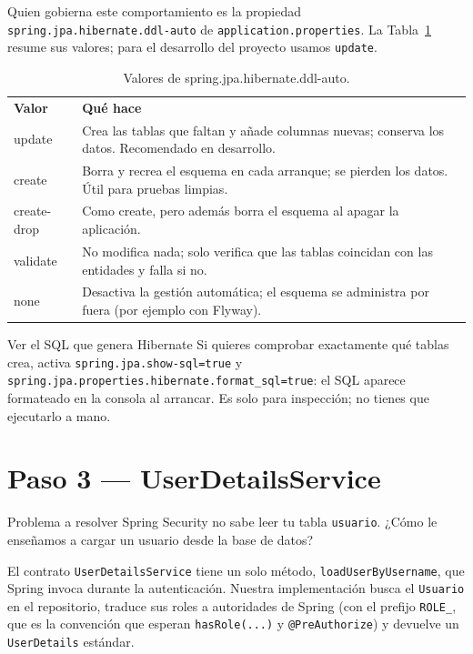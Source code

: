 \documentclass[11pt]{article}
\begin{document}
Quien gobierna este comportamiento es la propiedad \texttt{spring.\allowbreak{}jpa.\allowbreak{}hibernate.\allowbreak{}ddl-auto} de \texttt{application.properties}. La Tabla~\ref{tab:ddlauto} resume sus valores; para el desarrollo del proyecto usamos \texttt{update}.

\begin{table}[h]
\centering
\caption{Valores de spring.jpa.hibernate.ddl-auto.}
\label{tab:ddlauto}
\renewcommand{\arraystretch}{1.25}
\begin{tabular}{>{\ttfamily}p{2.6cm} >{\raggedright\arraybackslash}p{11.4cm}}
\rowcolor{jwebazul!12}
\textnormal{\textbf{Valor}} & \textbf{Qué hace} \\
update & Crea las tablas que faltan y añade columnas nuevas; conserva los datos. Recomendado en desarrollo. \\
create & Borra y recrea el esquema en cada arranque; se pierden los datos. Útil para pruebas limpias. \\
create-drop & Como create, pero además borra el esquema al apagar la aplicación. \\
validate & No modifica nada; solo verifica que las tablas coincidan con las entidades y falla si no. \\
none & Desactiva la gestión automática; el esquema se administra por fuera (por ejemplo con Flyway). \\
\end{tabular}
\end{table}

\begin{cajatip}{Ver el SQL que genera Hibernate}
Si quieres comprobar exactamente qué tablas crea, activa \texttt{spring.jpa.show-sql=true} y \texttt{spring.jpa.properties.hibernate.format\_sql=true}: el SQL aparece formateado en la consola al arrancar. Es solo para inspección; no tienes que ejecutarlo a mano.\par
\end{cajatip}

\section{Paso 3 --- UserDetailsService}
\begin{cajaproblema}{Problema a resolver}
Spring Security no sabe leer tu tabla \texttt{usuario}. ¿Cómo le enseñamos a cargar un usuario desde la base de datos?\par
\end{cajaproblema}
El contrato \texttt{UserDetailsService} tiene un solo método, \texttt{loadUserByUsername}, que Spring invoca durante la autenticación. Nuestra implementación busca el \texttt{Usuario} en el repositorio, traduce sus roles a autoridades de Spring (con el prefijo \texttt{ROLE\_}, que es la convención que esperan \texttt{hasRole(...)} y \texttt{@PreAuthorize}) y devuelve un \texttt{UserDetails} estándar.
\end{document}
